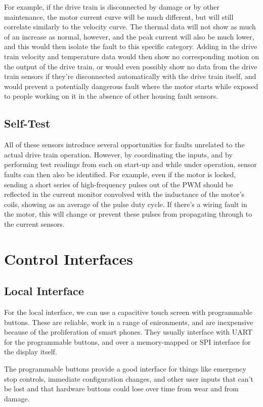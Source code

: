 \documentclass{article}
\begin{document}
For example, if the drive train is disconnected by damage or by other
maintenance, the motor current curve will be much different, but will
still correlate similarly to the velocity curve. The thermal data will
not show as much of an increase as normal, however, and the peak
current will also be much lower, and this would then isolate the fault
to this specific category. Adding in the drive train velocity and
temperature data would then show no corresponding motion on the output
of the drive train, or would even possibly show no data from the drive
train sensors if they’re disconnected automatically with the drive
train itself, and would prevent a potentially dangerous fault where
the motor starts while exposed to people working on it in the absence
of other housing fault sensors.

\subsection{Self-Test}

All of these sensors introduce several opportunities for faults
unrelated to the actual drive train operation. However, by
coordinating the inputs, and by performing test readings from each on
start-up and while under operation, sensor faults can then also
be identified. For example, even if the motor is locked, sending
a short series of high-frequency pulses out of the PWM should be
reflected in the current monitor convolved with the inductance of the
motor’s coils, showing as an average of the pulse duty cycle.
If there’s a wiring fault in the motor, this will change or prevent
these pulses from propagating through to the current sensors.

\section{Control Interfaces}

\subsection{Local Interface}

For the local interface, we can use a capacitive touch screen with
programmable buttons. These are reliable, work in a range of
enironments, and are inexpensive because of the proliferation of
smart phones. They usually interface with UART for the programmable
buttons, and over a memory-mapped or SPI interface for the
display itself.

The programmable buttons provide a good interface for things like
emergency stop controls, immediate configuration changes, and other
user inputs that can’t be lost and that hardware buttons could lose
over time from wear and from damage.
\end{document}
